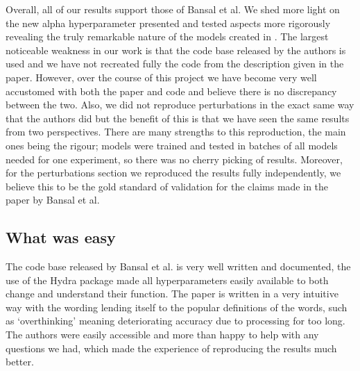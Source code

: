 Overall, all of our results support those of Bansal et al. We shed more light on the new alpha hyperparameter presented and tested aspects more rigorously revealing the truly remarkable nature of the models created in \cite{bansal2022endtoend}. The largest noticeable weakness in our work is that the code base released by the authors is used and we have not recreated fully the code from the description given in the paper. However, over the course of this project we have become very well accustomed with both the paper and code and believe there is no discrepancy between the two. Also, we did not reproduce perturbations in the exact same way that the authors did but the benefit of this is that we have seen the same results from two perspectives. There are many strengths to this reproduction, the main ones being the rigour; models were trained and tested in batches of all models needed for one experiment, so there was no cherry picking of results. Moreover, for the perturbations section we reproduced the results fully independently, we believe this to be the gold standard of validation for the claims made in the paper by Bansal et al.

\subsection{What was easy}

The code base released by Bansal et al. is very well written and documented, the use of the Hydra package \cite{Yadan2019Hydra} made all hyperparameters easily available to both change and understand their function. 
The paper is written in a very intuitive way with the wording lending itself to the popular definitions of the words, such as `overthinking' meaning deteriorating accuracy due to processing for too long.
The authors were easily accessible and more than happy to help with any questions we had, which made the experience of reproducing the results much better.


